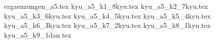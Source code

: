 

	{ergaenzungen_a5.tex}\clearpage\pagebreak
	{kyu_a5_k1_8kyu.tex}\clearpage\pagebreak
	{kyu_a5_k2_7kyu.tex}\clearpage\pagebreak
	{kyu_a5_k3_6kyu.tex}\clearpage\pagebreak
	{kyu_a5_k4_5kyu.tex}\clearpage\pagebreak
	{kyu_a5_k5_4kyu.tex}\clearpage\pagebreak
	{kyu_a5_k6_3kyu.tex}\clearpage\pagebreak
	{kyu_a5_k7_2kyu.tex}\clearpage\pagebreak
	{kyu_a5_k8_1kyu.tex}\clearpage\pagebreak
	{kyu_a5_k9_1dan.tex}\clearpage\pagebreak
	\AddToShipoutPictureFG{\ShowDraft}

